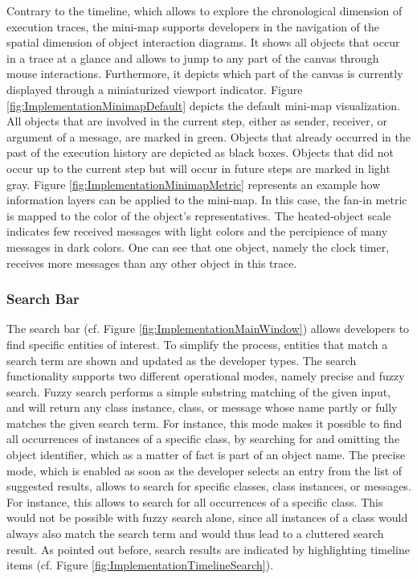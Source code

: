 Contrary to the timeline, which allows to explore the chronological dimension of execution traces, the mini-map supports developers in the navigation of the spatial dimension of object interaction diagrams.
It shows all objects that occur in a trace at a glance and allows to jump to any part of the canvas through mouse interactions.
Furthermore, it depicts which part of the canvas is currently displayed through a miniaturized viewport indicator.
Figure \ref{fig:ImplementationMinimapDefault} depicts the default mini-map visualization.
All objects that are involved in the current step, either as sender, receiver, or argument of a message, are marked in green.
Objects that already occurred in the past of the execution history are depicted as black boxes.
Objects that did not occur up to the current step but will occur in future steps are marked in light gray.
Figure \ref{fig:ImplementationMinimapMetric} represents an example how information layers can be applied to the mini-map.
In this case, the fan-in metric is mapped to the color of the object's representatives.
The heated-object scale indicates few received messages with light colors and the percipience of many messages in dark colors.
One can see that one object, namely the clock timer, receives more messages than any other object in this trace.

\subsubsection{Search Bar}
The search bar (cf. Figure \ref{fig:ImplementationMainWindow}) allows developers to find specific entities of interest.
To simplify the process, entities that match a search term are shown and updated as the developer types.
The search functionality supports two different operational modes, namely precise and fuzzy search.
Fuzzy search performs a simple substring matching of the given input, and will return any class instance, class, or message whose name partly or fully matches the given search term.
For instance, this mode makes it possible to find all occurrences of instances of a specific class, by searching for  and omitting the object identifier, which as a matter of fact is part of an object name.
The precise mode, which is enabled as soon as the developer selects an entry from the list of suggested results, allows to search for specific classes, class instances, or messages.
For instance, this allows to search for all occurrences of a specific class.
This would not be possible with fuzzy search alone, since all instances of a class would always also match the search term and would thus lead to a cluttered search result.
As pointed out before, search results are indicated by highlighting timeline items (cf. Figure \ref{fig:ImplementationTimelineSearch}).

